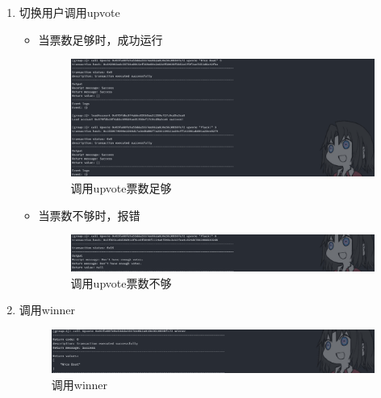 \documentclass[a4paper, 11pt]{article}
\begin{document}
\begin{enumerate}
      \item 切换用户调用upvote
      \begin{itemize}
            \item 当票数足够时，成功运行
            \begin{figure}[H]
                  \centering
                  \includegraphics[width = 0.8 \textwidth]{upvote.png}
                  \caption{调用upvote票数足够}
            \end{figure}

            \item 当票数不够时，报错
            \begin{figure}[H]
                  \centering
                  \includegraphics[width = 0.8 \textwidth]{upvoteerror.png}
                  \caption{调用upvote票数不够}
            \end{figure}
      \end{itemize}

      \item 调用winner
      \begin{figure}[H]
            \centering
            \includegraphics[width = 0.8 \textwidth]{winner.png}
            \caption{调用winner}
      \end{figure}
\end{enumerate}
\end{document}
